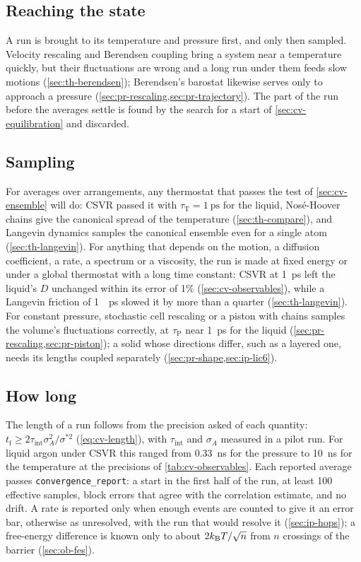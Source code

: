 \subsection*{Reaching the state}

A run is brought to its temperature and pressure first, and only then
sampled. Velocity rescaling and Berendsen coupling bring a system near a
temperature quickly, but their fluctuations are wrong and a long run under
them feeds slow motions (\cref{sec:th-berendsen}); Berendsen's barostat
likewise serves only to approach a pressure
(\cref{sec:pr-rescaling,sec:pr-trajectory}). The part of the run before
the averages settle is found by the search for a start of
\cref{sec:cv-equilibration} and discarded.

\subsection*{Sampling}

For averages over arrangements, any thermostat that passes the test of
\cref{sec:cv-ensemble} will do: CSVR passed it with $\tau_{\mathrm T} =
\SI{1}{\pico\second}$ for the liquid, Nosé-Hoover chains give the
canonical spread of the temperature (\cref{sec:th-compare}), and Langevin
dynamics samples the canonical ensemble even for a single atom
(\cref{sec:th-langevin}). For anything that depends on the motion, a
diffusion coefficient, a rate, a spectrum or a viscosity, the run is made
at fixed energy or under a global thermostat with a long time constant:
CSVR at \SI{1}{\pico\second} left the liquid's $D$ unchanged within its
error of 1\% (\cref{sec:cv-observables}), while a Langevin friction of
\SI{1}{\per\pico\second} slowed it by more than a quarter
(\cref{sec:th-langevin}). For constant pressure, stochastic cell rescaling
or a piston with chains samples the volume's fluctuations correctly, at
$\tau_{\mathrm P}$ near \SI{1}{\pico\second} for the liquid
(\cref{sec:pr-rescaling,sec:pr-piston}); a solid whose directions differ,
such as a layered one, needs its lengths coupled separately
(\cref{sec:pr-shape,sec:ip-lic6}).

\subsection*{How long}

The length of a run follows from the precision asked of each quantity:
$t_{\mathrm f} \ge 2\tau_{\mathrm{int}}\sigma_A^2/\sigma^{\ast2}$
(\cref{eq:cv-length}), with $\tau_{\mathrm{int}}$ and $\sigma_A$ measured
in a pilot run. For liquid argon under CSVR this ranged from
\SI{0.33}{\nano\second} for the pressure to \SI{10}{\nano\second} for the
temperature at the precisions of \cref{tab:cv-observables}. Each reported
average passes \texttt{convergence\_report}: a start in the first half of
the run, at least 100 effective samples, block errors that agree with the
correlation estimate, and no drift. A rate is reported only when enough
events are counted to give it an error bar, otherwise as unresolved, with
the run that would resolve it (\cref{sec:ip-hops}); a free-energy
difference is known only to about $2k_{\mathrm{B}} T/\sqrt n$ from $n$ crossings of
the barrier (\cref{sec:ob-fes}).

